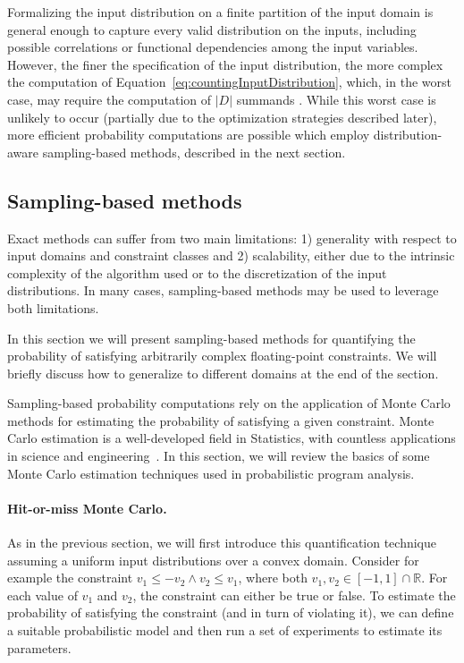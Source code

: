 Formalizing the input distribution on a finite partition of the input domain is general enough to capture every valid distribution on the inputs, including possible correlations or functional dependencies among the input variables. However, the finer the specification of the input distribution, the more complex the computation of Equation~\eqref{eq:countingInputDistribution}, which, in the worst case, may require the computation of $|D|$ summands \cite{Borges2014}. While this worst case is unlikely to occur (partially due to the optimization strategies described later), more efficient probability computations are possible which employ distribution-aware sampling-based methods, described in the next section.

\subsection{Sampling-based methods}\label{sec:computingprobabilitiesSampling}
Exact methods can suffer from two main limitations: 1) generality with respect to input domains and constraint classes and 2) scalability, either due to the intrinsic complexity of the algorithm used or to the discretization of the input distributions. In many cases, sampling-based methods may be used to leverage both limitations.

In this section we will present sampling-based methods for quantifying the probability of satisfying arbitrarily complex floating-point constraints. We will briefly discuss how to generalize to different domains at the end of the section.

Sampling-based probability computations rely on the application of Monte Carlo methods for estimating the probability of satisfying a given constraint. Monte Carlo estimation is a well-developed field in Statistics, with countless applications in science and engineering~\cite{robert2013monte}. In this section, we will review the basics of some Monte Carlo estimation techniques used in probabilistic program analysis. %

\paragraph{Hit-or-miss Monte Carlo.}

As in the previous section, we will first introduce this quantification technique assuming a uniform input distributions over a convex domain. Consider for example the constraint $v_1 \leq -v_2 \land v_2 \leq v_1$, where both $v_1, v_2 \in [-1, 1] \cap \mathbb{R}$. For each value of $v_1$ and $v_2$, the constraint can either be true or false. To estimate the probability of satisfying the constraint (and in turn of violating it), we can define a suitable probabilistic model and then run a set of experiments to estimate its parameters.

